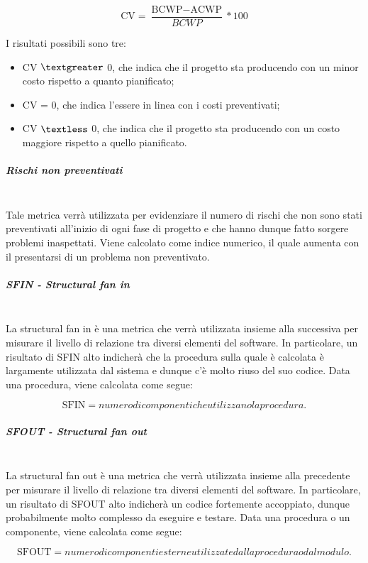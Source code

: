 \begin{displaymath}
	\mbox{CV}= \frac{\mbox{BCWP}-\mbox{ACWP}}{BCWP}*100
\end{displaymath}

I risultati possibili sono tre:

\begin{itemize}
	\item CV $\textgreater$ 0, che indica che il progetto sta producendo con un minor costo rispetto a quanto pianificato;
	\item CV = 0, che indica l'essere in linea con i costi preventivati;
	\item CV $\textless$ 0, che indica che il progetto sta producendo con un costo maggiore rispetto a quello pianificato.
\end{itemize}

\subparagraph{Rischi non preventivati}
\label{AppB:RischiNP}
~\\Tale metrica verrà utilizzata per evidenziare il numero di rischi che non sono stati preventivati all'inizio di ogni fase di progetto e che hanno dunque fatto sorgere problemi inaspettati. Viene calcolato come indice numerico, il quale aumenta con il presentarsi di un problema non preventivato.

\subparagraph{SFIN - Structural fan in}
\label{AppB:SFIN}
~\\La structural fan in è una metrica che verrà utilizzata insieme alla successiva per misurare il livello di relazione tra diversi elementi del software. In particolare, un risultato di SFIN alto indicherà che la procedura sulla quale è calcolata è largamente utilizzata dal sistema e dunque c'è molto riuso del suo codice.
Data una procedura, viene calcolata come segue:

\begin{displaymath}
	\mbox{SFIN}= numero di componenti che utilizzano la procedura.
\end{displaymath}

\subparagraph{SFOUT - Structural fan out}
\label{AppB:SFOUT}
~\\La structural fan out è una metrica che verrà utilizzata insieme alla precedente per misurare il livello di relazione tra diversi elementi del software. In particolare, un risultato di SFOUT alto indicherà un codice fortemente accoppiato, dunque probabilmente molto complesso da eseguire e testare.
Data una procedura o un componente, viene calcolata come segue:

\begin{displaymath}
	\mbox{SFOUT}= numero di componenti esterne utilizzate dalla procedura o dal modulo.
\end{displaymath}


